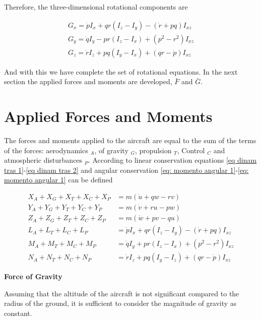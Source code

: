 Therefore, the three-dimensional rotational components are

\begin{gather}
\label{eq: momento angular 1}
    G_x = \dot{p} I_{x} + qr (I_{z} - I_{y}) - (\dot{r} + pq) I_{xz} \\
    G_y = \dot{q} I_{y} - pr (I_{z} - I_{x}) + (p^2 - r^2) I_{xz} \\
    G_z = \dot{r} I_{z} + pq (I_{y} - I_{x}) + (qr - \dot{p}) I_{xz}
\label{eq: momento angular 2}
\end{gather}

And with this we have complete the set of rotational equations. In the next section the applied forces and moments are developed, $\bar{F}$ and $\bar{G}$. 

\bigskip
\section{Applied Forces and Moments}

The forces and moments applied to the aircraft are equal to the sum of the terms of the forces: aerodynamics $_A$, of gravity  $_G$, propulsion  $_T$, Control  $_C$ and atmospheric disturbances $_P$. According to linear conservation equations \ref{eq dinam tras 1}-\ref{eq dinam tras 2} and angular conservation \ref{eq: momento angular 1}-\ref{eq: momento angular 1} can be defined



\begin{align}
    X_{A} + X_{G} + X_{T} + X_{C} + X_{P} &= m (\dot u + qw - rv) \\
    Y_{A} + Y_{G} + Y_{T} + Y_{C} + Y_{P} &= m (\dot v + ru - pw) \\
    Z_{A} + Z_{G} + Z_{T} + Z_{C} + Z_{P} &= m (\dot w + pv - qu) \\
    L_{A} + L_{T} + L_{C} + L_{P} &= \dot p I_{x} + qr(I_{z} - I_{y}) - (\dot r + pq)I_{xz} \\
    M_{A} + M_{T} + M_{C} + M_{P}  &= \dot q I_{y} + pr(I_{z} - I_{x}) + (p^2 - r^2)I_{xz} \\
    N_{A} + N_{T} + N_{C} + N_{P} &= \dot r I_{z} + pq(I_{y} - I_{z}) + (qr - \dot p)I_{xz}
\end{align}


\textbf{Force of Gravity}


Assuming that the altitude of the aircraft is not significant compared to the radius of the ground, it is sufficient to consider the magnitude of gravity as constant. 


